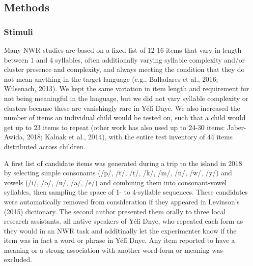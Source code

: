 \documentclass[english,,man,floatsintext]{apa6}
\begin{document}
\hypertarget{methods}{%
\subsection{Methods}\label{methods}}

\hypertarget{stimuli}{%
\subsubsection{Stimuli}\label{stimuli}}

Many NWR studies are based on a fixed list of 12-16 items that vary in length between 1 and 4 syllables, often additionally varying syllable complexity and/or cluster presence and complexity, and always meeting the condition that they do not mean anything in the target language (e.g., Balladares et al., 2016; Wilsenach, 2013). We kept the same variation in item length and requirement for not being meaningful in the language, but we did not vary syllable complexity or clusters because these are vanishingly rare in Yélî Dnye. We also increased the number of items an individual child would be tested on, such that a child would get up to 23 items to repeat (other work has also used up to 24-30 items: Jaber-Awida, 2018; Kalnak et al., 2014), with the entire test inventory of 44 items distributed across children.

A first list of candidate items was generated during a trip to the island in 2018 by selecting simple consonants (/p/, /t/, /ṭ/, /k/, /m/, /n/, /w/, /y/) and vowels (/i/, /o/, /u/, /a/, /e/) and combining them into consonant-vowel syllables, then sampling the space of 1- to 4-syllable sequences. These candidates were automatically removed from consideration if they appeared in Levinson's (2015) dictionary. The second author presented them orally to three local research assistants, all native speakers of Yélî Dnye, who repeated each form as they would in an NWR task and additinally let the experimenter know if the item was in fact a word or phrase in Yélî Dnye. Any item reported to have a meaning or a strong association with another word form or meaning was excluded.
\end{document}
